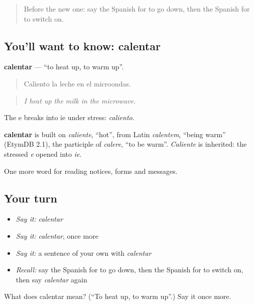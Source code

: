 \label{lesson:ES-C494-calentar}



\begin{quote}
Before the new one: say the Spanish for to go down, then the Spanish for to switch on.
\end{quote}

\subsection*{You'll want to know: calentar}
\textbf{calentar} — \textquotedblleft{}to heat up, to warm up\textquotedblright{}.

\begin{quote}
Caliento la leche en el microondas.
\end{quote}

\begin{quote}
\emph{I heat up the milk in the microwave.}
\end{quote}

The e breaks into ie under stress: \emph{caliento}.

\begin{cousinweb}
\textbf{calentar} is built on \emph{caliente}, \textquotedblleft{}hot\textquotedblright{}, from Latin \emph{calentem}, \textquotedblleft{}being warm\textquotedblright{} (EtymDB 2.1), the participle of \emph{calere}, \textquotedblleft{}to be warm\textquotedblright{}. \emph{Caliente} is inherited: the stressed \emph{e} opened into \emph{ie}.
\end{cousinweb}

\begin{grammarlens}[title={What you've built}]
One more word for reading notices, forms and messages.
\end{grammarlens}

\subsection*{Your turn}
\begin{itemize}
\raggedright
  \item \emph{Say it:} \emph{calentar}
  \item \emph{Say it:} \emph{calentar}, once more
  \item \emph{Say it:} a sentence of your own with \emph{calentar}
  \item \emph{Recall:} say the Spanish for to go down, then the Spanish for to switch on, then say \emph{calentar} again
\end{itemize}

\begin{tcolorbox}[breakable,colback=teal!4,colframe=teal!35!black,title={Before you move on}]
What does calentar mean? (\textquotedblleft{}To heat up, to warm up\textquotedblright{}.) Say it once more.
\end{tcolorbox}
